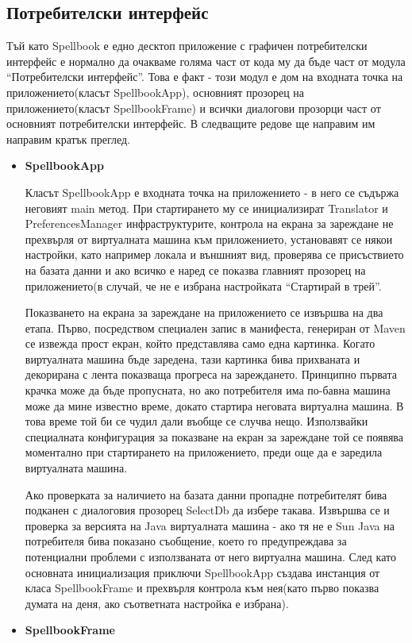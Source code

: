 \subsection{Потребителски интерфейс}

Тъй като Spellbook е едно десктоп приложение с графичен потребителски
интерфейс е нормално да очакваме голяма част от кода му да бъде част
от модула "`Потребителски интерфейс"'. Това е факт - този модул е дом
на входната точка на приложението(класът SpellbookApp), основният
прозорец на приложението(класът SpellbookFrame) и всички диалогови
прозорци част от основният потребителски интерфейс. В следващите
редове ще направим им направим кратък преглед.


\begin{itemize}
  \item \textbf{SpellbookApp}

    Класът SpellbookApp е входната точка на приложението - в него се
    съдържа неговият main метод. При стартирането му се инициализират
    Translator и PreferencesManager инфраструктурите, контрола на
    екрана за зареждане не прехвърля от виртуалната машина към
    приложението, установавят се някои настройки, като например локала
    и външният вид, проверява се присъствието на базата данни и ако
    всичко е наред се показва главният прозорец на приложението(в
    случай, че не е избрана настройката "`Стартирай в трей"'.

    Показването на екрана за зареждане на приложението се извършва на
    два етапа. Първо, посредством специален запис в манифеста,
    генериран от Maven се извежда прост екран, който представлява само
    една картинка. Когато виртуалната машина бъде заредена, тази
    картинка бива прихваната и декорирана с лента показваща прогреса
    на зареждането. Принципно първата крачка може да бъде пропусната,
    но ако потребителя има по-бавна машина може да мине известно
    време, докато стартира неговата виртуална машина. В това време той
    би се чудил дали въобще се случва нещо. Използвайки специалната
    конфигурация за показване на екран за зареждане той се появява
    моментално при стартирането на приложението, преди още да е
    заредила виртуалната машина. 

    Ако проверката за наличието на базата данни пропадне потребителят
    бива подканен с диалоговия прозорец SelectDb да избере
    такава. Извършва се и проверка за версията на Java виртуалната
    машина - ако тя не е Sun Java на потребителя бива показано
    съобщение, което го предупреждава за потенциални проблеми с
    използваната от него виртуална машина. След като основната
    инициализация приключи SpellbookApp създава инстанция от класа
    SpellbookFrame и прехвърля контрола към нея(като първо показва
    думата на деня, ако съответната настройка е избрана).
  \item \textbf{SpellbookFrame}


\end{itemize}
